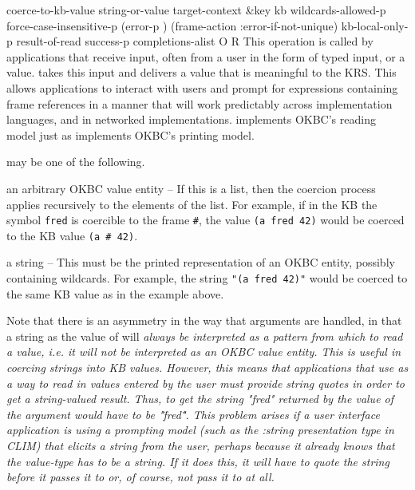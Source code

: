 \begin{okbcop}{coerce-to-kb-value}{ string-or-value target-context \&key kb wildcards-allowed-p force-case-insensitive-p (error-p \true) (frame-action :error-if-not-unique) kb-local-only-p} { result-of-read success-p completions-alist } { O } { R } {  }
This operation is called by applications that receive input, often from a
   user in the form of typed input, or a value.  
   takes this input and delivers a value that is meaningful to the KRS.  This
   allows applications to interact with users and prompt for expressions
   containing frame references in a manner that will work predictably across
   implementation languages, and in networked implementations.
    implements OKBC's reading model just as
    implements OKBC's printing model.

    may be one of the following.
   \bitem
   \item an arbitrary OKBC value entity -- If this is a list, then the
          coercion process applies recursively to the elements of the list.
          For example, if in the KB the symbol {\tt fred} is coercible to the
          frame {\tt \#<frame FRED 763736>}, the value {\tt (a fred 42)}
          would be coerced to the KB value
          {\tt (a \#<frame FRED 763736> 42)}.
   \item a string -- This must be the printed representation of an OKBC entity,
          possibly containing wildcards.  For example, the string
          {\tt "(a fred 42)"} would be coerced to the same KB value as in
          the example above.
   \eitem

   Note that there is an asymmetry in the way that arguments are handled,
   in that a string as the value of  will \em{always}
   be interpreted as a pattern from which to read a value, i.e. it will not
   be interpreted as an OKBC value entity.  This is useful in coercing strings
   into KB values.  However, this means that applications that use
    as a way to read in values entered by the user
   must provide string quotes in order to get a string-valued result.  Thus,
   to get the string "fred" returned by  the
   value of the  argument would have to be
   "\"fred\"".  This problem arises if a user interface application
   is using a prompting model (such as the :string presentation type in CLIM)
   that elicits a string from the user, perhaps because it already knows that
   the value-type has to be a string.  If it does this, it will have to
   quote the string before it passes it to  or, of
   course, not pass it to  at all.


\end{okbcop}
